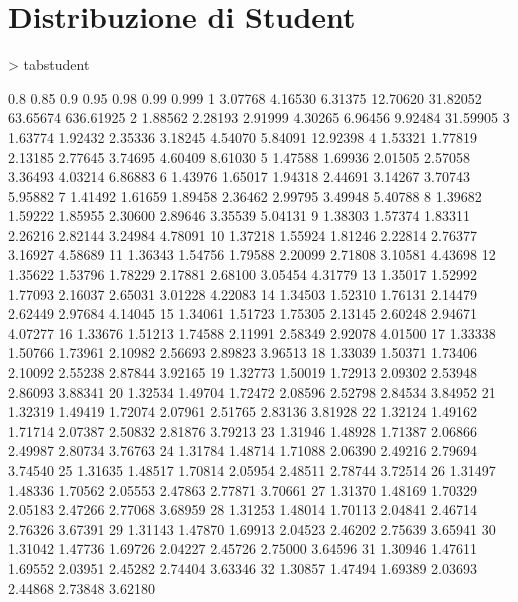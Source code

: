 \documentclass[onecolumn,11pt]{book}
\begin{document}
\section*{Distribuzione di Student}
\oddsidemargin 0.0in
\evensidemargin 0.0in
\topmargin -0.4in
\begin{Schunk}
\begin{Sinput}
>  tabstudent
\end{Sinput}
\begin{Soutput}
        0.8    0.85     0.9     0.95     0.98     0.99     0.999
1   3.07768 4.16530 6.31375 12.70620 31.82052 63.65674 636.61925
2   1.88562 2.28193 2.91999  4.30265  6.96456  9.92484  31.59905
3   1.63774 1.92432 2.35336  3.18245  4.54070  5.84091  12.92398
4   1.53321 1.77819 2.13185  2.77645  3.74695  4.60409   8.61030
5   1.47588 1.69936 2.01505  2.57058  3.36493  4.03214   6.86883
6   1.43976 1.65017 1.94318  2.44691  3.14267  3.70743   5.95882
7   1.41492 1.61659 1.89458  2.36462  2.99795  3.49948   5.40788
8   1.39682 1.59222 1.85955  2.30600  2.89646  3.35539   5.04131
9   1.38303 1.57374 1.83311  2.26216  2.82144  3.24984   4.78091
10  1.37218 1.55924 1.81246  2.22814  2.76377  3.16927   4.58689
11  1.36343 1.54756 1.79588  2.20099  2.71808  3.10581   4.43698
12  1.35622 1.53796 1.78229  2.17881  2.68100  3.05454   4.31779
13  1.35017 1.52992 1.77093  2.16037  2.65031  3.01228   4.22083
14  1.34503 1.52310 1.76131  2.14479  2.62449  2.97684   4.14045
15  1.34061 1.51723 1.75305  2.13145  2.60248  2.94671   4.07277
16  1.33676 1.51213 1.74588  2.11991  2.58349  2.92078   4.01500
17  1.33338 1.50766 1.73961  2.10982  2.56693  2.89823   3.96513
18  1.33039 1.50371 1.73406  2.10092  2.55238  2.87844   3.92165
19  1.32773 1.50019 1.72913  2.09302  2.53948  2.86093   3.88341
20  1.32534 1.49704 1.72472  2.08596  2.52798  2.84534   3.84952
21  1.32319 1.49419 1.72074  2.07961  2.51765  2.83136   3.81928
22  1.32124 1.49162 1.71714  2.07387  2.50832  2.81876   3.79213
23  1.31946 1.48928 1.71387  2.06866  2.49987  2.80734   3.76763
24  1.31784 1.48714 1.71088  2.06390  2.49216  2.79694   3.74540
25  1.31635 1.48517 1.70814  2.05954  2.48511  2.78744   3.72514
26  1.31497 1.48336 1.70562  2.05553  2.47863  2.77871   3.70661
27  1.31370 1.48169 1.70329  2.05183  2.47266  2.77068   3.68959
28  1.31253 1.48014 1.70113  2.04841  2.46714  2.76326   3.67391
29  1.31143 1.47870 1.69913  2.04523  2.46202  2.75639   3.65941
30  1.31042 1.47736 1.69726  2.04227  2.45726  2.75000   3.64596
31  1.30946 1.47611 1.69552  2.03951  2.45282  2.74404   3.63346
32  1.30857 1.47494 1.69389  2.03693  2.44868  2.73848   3.62180

\end{Soutput}
\end{Schunk}
\end{document}
